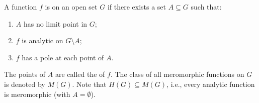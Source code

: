 A function $f$ is  on an open set $G$ if there exists a set $A \subseteq G$ such that:
\begin{enumerate}
\item $A$ has no limit point in $G$;
\item $f$ is analytic on $G \setminus A$;
\item $f$ has a pole at each point of $A$.
\end{enumerate}
The points of $A$ are called the  of $f$. The class of all meromorphic functions on $G$ is denoted by $M(G)$. Note that $H(G) \subseteq M(G)$, i.e., every analytic function is meromorphic (with $A = \emptyset$).
